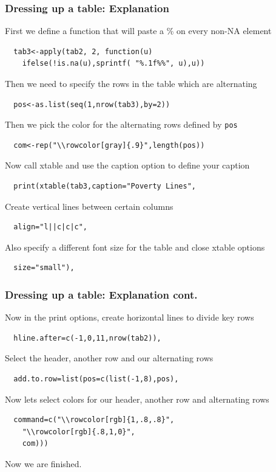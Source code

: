 \documentclass[nogin]{beamer}\usepackage[]{graphicx}\usepackage[]{color}
\begin{document}
\begin{frame}[fragile]
\frametitle{Dressing up a table: Explanation}
\footnotesize
First we define a function that will paste a \% on every non-NA element
\begin{verbatim}
  tab3<-apply(tab2, 2, function(u) 
    ifelse(!is.na(u),sprintf( "%.1f%%", u),u))
\end{verbatim}
Then we need to specify the rows in the table which are alternating
\begin{verbatim}
  pos<-as.list(seq(1,nrow(tab3),by=2))
\end{verbatim}
Then we pick the color for the alternating rows defined by \verb|pos|
\begin{verbatim}
  com<-rep("\\rowcolor[gray]{.9}",length(pos))
\end{verbatim}
Now call xtable and use the caption option to define your caption
\begin{verbatim}
  print(xtable(tab3,caption="Poverty Lines",
\end{verbatim}
Create vertical lines between certain columns
\begin{verbatim}
  align="l||c|c|c",
\end{verbatim}
Also specify a different font size for the table and close xtable options
\begin{verbatim}
  size="small"),
\end{verbatim}
\end{frame}
\begin{frame}[fragile]
\frametitle{Dressing up a table: Explanation cont.}
\footnotesize
Now in the print options, create horizontal lines to divide key rows
\begin{verbatim}
  hline.after=c(-1,0,11,nrow(tab2)),
\end{verbatim}
Select the header, another row and our alternating rows
\begin{verbatim}
  add.to.row=list(pos=c(list(-1,8),pos),
\end{verbatim}
Now lets select colors for our header, another row and alternating rows
\begin{verbatim}
  command=c("\\rowcolor[rgb]{1,.8,.8}",
    "\\rowcolor[rgb]{.8,1,0}",
    com)))
\end{verbatim}
Now we are finished.
\end{frame}
\end{document}
